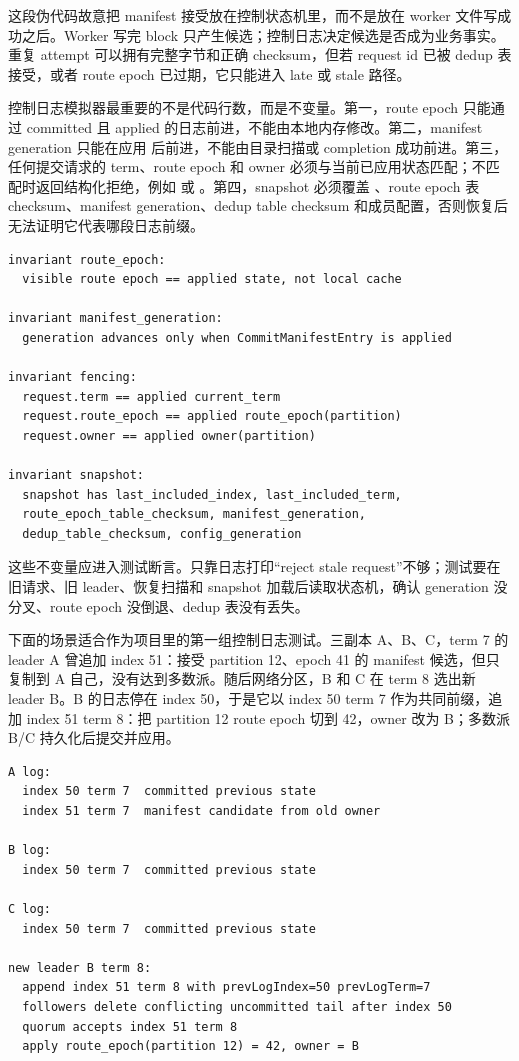 这段伪代码故意把 manifest 接受放在控制状态机里，而不是放在 worker 文件写成功之后。Worker 写完 block 只产生候选；控制日志决定候选是否成为业务事实。重复 attempt 可以拥有完整字节和正确 checksum，但若 request id 已被 dedup 表接受，或者 route epoch 已过期，它只能进入 late 或 stale 路径。

控制日志模拟器最重要的不是代码行数，而是不变量。第一，route epoch 只能通过 committed 且 applied 的日志前进，不能由本地内存修改。第二，manifest generation 只能在应用  后前进，不能由目录扫描或 completion 成功前进。第三，任何提交请求的 term、route epoch 和 owner 必须与当前已应用状态匹配；不匹配时返回结构化拒绝，例如  或 。第四，snapshot 必须覆盖 、route epoch 表 checksum、manifest generation、dedup table checksum 和成员配置，否则恢复后无法证明它代表哪段日志前缀。

\begin{lstlisting}[numbers=none,caption={控制日志不变量}]
invariant route_epoch:
  visible route epoch == applied state, not local cache

invariant manifest_generation:
  generation advances only when CommitManifestEntry is applied

invariant fencing:
  request.term == applied current_term
  request.route_epoch == applied route_epoch(partition)
  request.owner == applied owner(partition)

invariant snapshot:
  snapshot has last_included_index, last_included_term,
  route_epoch_table_checksum, manifest_generation,
  dedup_table_checksum, config_generation
\end{lstlisting}

这些不变量应进入测试断言。只靠日志打印“reject stale request”不够；测试要在旧请求、旧 leader、恢复扫描和 snapshot 加载后读取状态机，确认 generation 没分叉、route epoch 没倒退、dedup 表没有丢失。

下面的场景适合作为项目里的第一组控制日志测试。三副本 A、B、C，term 7 的 leader A 曾追加 index 51：接受 partition 12、epoch 41 的 manifest 候选，但只复制到 A 自己，没有达到多数派。随后网络分区，B 和 C 在 term 8 选出新 leader B。B 的日志停在 index 50，于是它以 index 50 term 7 作为共同前缀，追加 index 51 term 8：把 partition 12 route epoch 切到 42，owner 改为 B；多数派 B/C 持久化后提交并应用。

\begin{lstlisting}[numbers=none,caption={旧 leader 尾部被新 leader 修正}]
A log:
  index 50 term 7  committed previous state
  index 51 term 7  manifest candidate from old owner

B log:
  index 50 term 7  committed previous state

C log:
  index 50 term 7  committed previous state

new leader B term 8:
  append index 51 term 8 with prevLogIndex=50 prevLogTerm=7
  followers delete conflicting uncommitted tail after index 50
  quorum accepts index 51 term 8
  apply route_epoch(partition 12) = 42, owner = B
\end{lstlisting}

